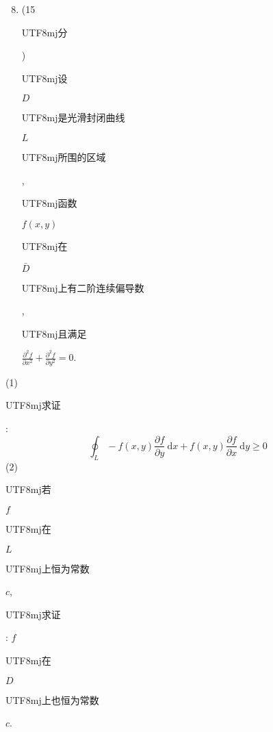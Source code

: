 \documentclass[10pt]{article}
\begin{document}
\begin{enumerate}
  \setcounter{enumi}{7}
  \item (15 \begin{CJK}{UTF8}{mj}分\end{CJK}) \begin{CJK}{UTF8}{mj}设\end{CJK} $D$ \begin{CJK}{UTF8}{mj}是光滑封闭曲线\end{CJK} $L$ \begin{CJK}{UTF8}{mj}所围的区域\end{CJK}, \begin{CJK}{UTF8}{mj}函数\end{CJK} $f(x, y)$ \begin{CJK}{UTF8}{mj}在\end{CJK} $\bar{D}$ \begin{CJK}{UTF8}{mj}上有二阶连续偏导数\end{CJK}, \begin{CJK}{UTF8}{mj}且满足\end{CJK} $\frac{\partial^{2} f}{\partial x^{2}}+\frac{\partial^{2} f}{\partial y^{2}}=0$.
\end{enumerate}
(1) \begin{CJK}{UTF8}{mj}求证\end{CJK}:
$$
\oint_{L}-f(x, y) \frac{\partial f}{\partial y} \mathrm{~d} x+f(x, y) \frac{\partial f}{\partial x} \mathrm{~d} y \geqslant 0
$$
(2) \begin{CJK}{UTF8}{mj}若\end{CJK} $f$ \begin{CJK}{UTF8}{mj}在\end{CJK} $L$ \begin{CJK}{UTF8}{mj}上恒为常数\end{CJK} $c$, \begin{CJK}{UTF8}{mj}求证\end{CJK}: $f$ \begin{CJK}{UTF8}{mj}在\end{CJK} $D$ \begin{CJK}{UTF8}{mj}上也恒为常数\end{CJK} $c$.
\end{document}

